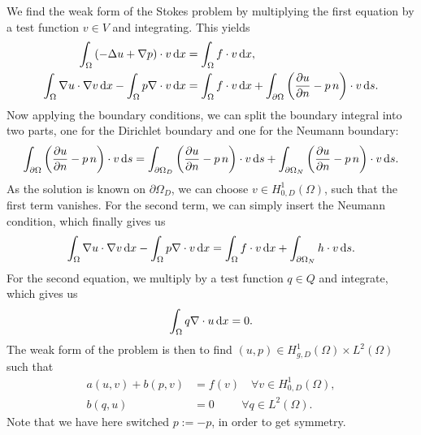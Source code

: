 We find the weak form of the Stokes problem by multiplying the first equation by a test function \( v \in V \) and integrating.
This yields
\begin{align*}
    \int_{\Omega} \left(
        -\Delta u + \nabla p
    \right) \cdot v \mathop{}\!\mathrm{d} x &= \int_{\Omega} f \cdot v \mathop{}\!\mathrm{d} x, \\
    \int_{\Omega} \nabla u \cdot \nabla v \mathop{}\!\mathrm{d} x - \int_\Omega p \nabla \cdot v \mathop{}\!\mathrm{d} x &= \int_{\Omega} f \cdot v \mathop{}\!\mathrm{d} x + \int_{\partial\Omega} \left(
        \frac{\partial u}{\partial n} - p\, n
    \right) \cdot v \mathop{}\!\mathrm{d} s.
\end{align*}
Now applying the boundary conditions, we can split the boundary integral into two parts, one for the Dirichlet boundary and one for the Neumann boundary:
\begin{equation}
    \int_{\partial\Omega} \left(
        \frac{\partial u}{\partial n} - p\, n
    \right) \cdot v \mathop{}\!\mathrm{d} s = \int_{\partial\Omega_D} \left(
        \frac{\partial u}{\partial n} - p\, n
    \right) \cdot v \mathop{}\!\mathrm{d} s + \int_{\partial\Omega_N} \left(
        \frac{\partial u}{\partial n} - p\, n
    \right) \cdot v \mathop{}\!\mathrm{d} s.
\end{equation}
As the solution is known on $\partial\Omega_D$, we can choose $v \in H^1_{0, D}(\Omega)$, such that the first term vanishes.
For the second term, we can simply insert the Neumann condition, which finally gives us
\begin{equation}
    \int_{\Omega} \nabla u \cdot \nabla v \mathop{}\!\mathrm{d} x - \int_\Omega p \nabla \cdot v \mathop{}\!\mathrm{d} x = \int_{\Omega} f \cdot v \mathop{}\!\mathrm{d} x + \int_{\partial\Omega_N} h \cdot v \mathop{}\!\mathrm{d} s.
\end{equation}
For the second equation, we multiply by a test function \( q \in Q \) and integrate, which gives us
\begin{equation}
    \int_{\Omega} q \nabla \cdot u \mathop{}\!\mathrm{d} x = 0.
\end{equation}
The weak form of the problem is then to find \( (u, p) \in H_{g, D}^1(\Omega) \times L^2(\Omega) \) such that
\begin{equation}
    \begin{split}
        a(u, v) + b(p, v) &= f(v) \quad \forall v \in H_{0,D}^1(\Omega), \\
        b(q, u) &= 0 \:\,\qquad \forall q \in L^2(\Omega).
    \end{split}
\end{equation}
Note that we have here switched \( p := -p \), in order to get symmetry.

